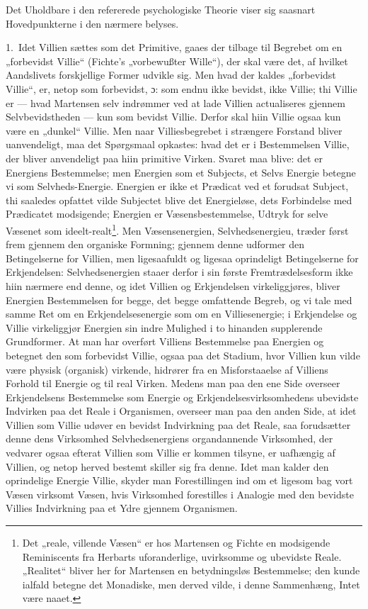 \documentclass[12pt,a4paper]{book}
\newcommand{\opage}[1]{\marginnote{\footnotesize\textit{[#1]}}}
\begin{document}
Det Uholdbare i den refererede psychologiske Theorie viser sig saasnart
Hovedpunkterne i den nærmere belyses.

1.\ Idet Villien sættes som det Primitive, gaaes der tilbage til Begrebet om en
„forbevidst Villie“ (Fichte's „vorbewußter Wille“), der skal være det, af hvilket
Aandslivets forskjellige Former udvikle sig. Men hvad der kaldes „forbevidst
Villie“, er, netop som forbevidst, ɔ: som endnu ikke bevidst, ikke Villie; thi
Villie er --- hvad Martensen selv indrømmer ved at lade Villien actualiseres
gjennem Selvbevidstheden --- kun som bevidst Villie. Derfor skal hiin Villie ogsaa
kun være en „dunkel“ Villie. Men naar Villiesbegrebet i strængere Forstand bliver
uanvendeligt, maa det Spørgsmaal opkastes: hvad det er i Bestemmelsen Villie, der
bliver anvendeligt paa hiin primitive Virken. Svaret maa blive: det er Energiens
Bestemmelse; men Energien som et Subjects, et Selvs Energie betegne vi som
Selvheds-Energie. Energien er ikke et Prædicat ved et forudsat Subject, thi
saaledes opfattet vilde Subjectet blive det Energieløse, dets Forbindelse med
Prædicatet modsigende; \opage{52}Energien er Væsensbestemmelse, Udtryk for selve Væsenet som
ideelt-realt\footnote{Det „reale, villende Væsen“ er hos Martensen og Fichte en
modsigende Reminiscents fra Herbarts uforanderlige, uvirksomme og ubevidste Reale.
„Realitet“ bliver her for Martensen en betydningsløs Bestemmelse; den kunde
ialfald betegne det Monadiske, men derved vilde, i denne Sammenhæng, Intet være
naaet.}. Men Væsensenergien, Selvhedsenergieu, træder først frem gjennem den
organiske Formning; gjennem denne udformer den Betingelserne for Villien, men
ligesaafuldt og ligesaa oprindeligt Betingelserne for Erkjendelsen:
Selvhedsenergien staaer derfor i sin første Fremtrædelsesform ikke hiin nærmere end
denne, og idet Villien og Erkjendelsen virkeliggjøres, bliver Energien
Bestemmelsen for begge, det begge omfattende Begreb, og vi tale med samme Ret om en
Erkjendelsesenergie som om en Villiesenergie; i Erkjendelse og Villie virkeliggjør
Energien sin indre Mulighed i to hinanden supplerende Grundformer. At man har
overført Villiens Bestemmelse paa Energien og betegnet den som forbevidst Villie,
ogsaa paa det Stadium, hvor Villien kun vilde være physisk (organisk) virkende,
hidrører fra en Misforstaaelse af Villiens Forhold til Energie og til real Virken.
Medens man paa den ene Side overseer Erkjendelsens Bestemmelse som Energie og
Erkjendelsesvirksomhedens ubevidste Indvirken paa det Reale i Organismen, overseer
man paa den anden Side, at idet Villien som Villie udøver en bevidst Indvirkning
paa det Reale, saa forudsætter denne dens Virksomhed Selvhedsenergiens
organdannende Virksomhed, der vedvarer ogsaa efterat Villien som Villie er kommen
tilsyne, er uafhængig af Villien, og netop herved bestemt skiller sig fra denne.
Idet man kalder den oprindelige Energie Villie, skyder man Forestillingen ind om
et ligesom bag vort Væsen virksomt Væsen, hvis Virksomhed forestilles i Analogie
med den bevidste Villies Indvirkning paa et Ydre gjennem Organismen.
\end{document}
